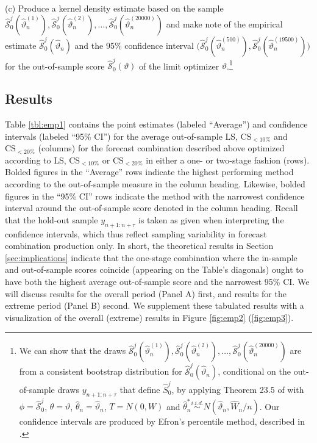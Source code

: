 \documentclass[12pt]{article}
\theoremstyle{definition}
\theoremstyle{remark}
\begin{document}
\noindent (c) Produce a kernel density estimate based on the sample $\hat{\mathcal{S}}_{0}^{j}(\hat{\vartheta}_{n}^{(1)}), \hat{\mathcal{S}}_{0}^{j}(\hat{\vartheta}_{n}^{(2)}), \ldots, \hat{\mathcal{S}}_{0}^{j}(\hat{\vartheta}_{n}^{(20000)})$ and make note of the empirical estimate $\hat{\mathcal{S}}_{0}^{j}(\hat{\vartheta}_{n})$ and the 95\% confidence interval $\Big(\hat{\mathcal{S}}_{0}^{j}(\hat{\vartheta}_{n}^{(500)}), \allowbreak\hat{\mathcal{S}}_{0}^{j}(\hat{\vartheta}_{n}^{(19500)})\Big)$ for the out-of-sample score $\hat{\mathcal{S}}_{0}^{j}(\vartheta )$ of the limit optimizer $\vartheta$.\footnote{We can show that the draws $\hat{\mathcal{S}}_{0}^{j}(\hat{\vartheta}_{n}^{(1)}),\hat{\mathcal{S}}_{0}^{j}(\hat{\vartheta}_{n}^{(2)}), \ldots, \hat{\mathcal{S}}_{0}^{j}(\hat{\vartheta}_{n}^{(20000)})$ are from a consistent bootstrap distribution for $\hat{\mathcal{S}}_{0}^{j}(\hat{\vartheta}_{n})$, conditional on the out-of-sample draws $y_{n+1:n+\tau}$ that define $\hat{S}_{0}^{j}$, by applying Theorem 23.5 of \cite{VanDerVaart1998} with $\phi = \hat{\mathcal{S}}_{0}^{j}$, $\theta = \vartheta$, $\hat{\theta}_{n} = \hat{\vartheta}_{n}$, $T = N(0,W)$ and $\hat{\theta}_{n}^{\ast} \overset{i.i.d.}{\sim} N(\hat{\vartheta}_{n}, \hat{W}_{n}/n)$. Our confidence intervals are produced by Efron's percentile method, described in \citet[sec. 23.1]{VanDerVaart1998}.}

\subsection{Results}

Table \ref{tbl:emp1} contains the point estimates (labeled ``Average'') and confidence intervals (labeled ``95\% CI'') for the average out-of-sample LS, $\mathrm{CS}_{<10\%}$ and $\mathrm{CS}_{<20\%}$ (columns) for the forecast combination described above optimized according to LS, $\mathrm{CS}_{<10\%}$ or $\mathrm{CS}_{<20\%}$ in either a one- or two-stage fashion (rows). Bolded figures in the ``Average'' rows indicate the highest performing method according to the out-of-sample measure in the column heading. Likewise, bolded figures in the ``95\% CI'' rows indicate the method with the narrowest confidence interval around the out-of-sample score denoted in the column heading. Recall that the hold-out sample $y_{n+1:n+\tau }$ is taken as given when interpreting the confidence intervals, which thus reflect sampling variability in forecast combination production only. In short, the theoretical results in Section \ref{sec:implications} indicate that the one-stage combination where the in-sample and out-of-sample scores coincide (appearing on the Table's diagonals) ought to have both the highest average out-of-sample score and the narrowest 95\% CI. We will discuss results for the overall period (Panel A) first, and results for the extreme period (Panel B) second. We supplement these tabulated results with a visualization of the overall (extreme) results in Figure \ref{fig:emp2} (\ref{fig:emp3}).
\end{document}
